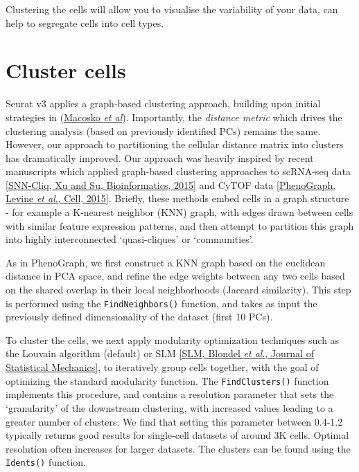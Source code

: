 \documentclass[
]{book}
\begin{document}
Clustering the cells will allow you to visualise the variability of your data, can help to segregate cells into cell types.

\subsubsection*{}\label{section-10}

\section{Cluster cells}\label{cluster-cells}

Seurat v3 applies a graph-based clustering approach, building upon initial strategies in (\href{http://www.cell.com/abstract/S0092-8674(15)00549-8}{Macosko \emph{et al}}). Importantly, the \emph{distance metric} which drives the clustering analysis (based on previously identified PCs) remains the same. However, our approach to partitioning the cellular distance matrix into clusters has dramatically improved. Our approach was heavily inspired by recent manuscripts which applied graph-based clustering approaches to scRNA-seq data \href{http://bioinformatics.oxfordjournals.org/content/early/2015/02/10/bioinformatics.btv088.abstract}{{[}SNN-Cliq, Xu and Su, Bioinformatics, 2015{]}} and CyTOF data \href{http://www.ncbi.nlm.nih.gov/pubmed/26095251}{{[}PhenoGraph, Levine \emph{et al}., Cell, 2015{]}}. Briefly, these methods embed cells in a graph structure - for example a K-nearest neighbor (KNN) graph, with edges drawn between cells with similar feature expression patterns, and then attempt to partition this graph into highly interconnected `quasi-cliques' or `communities'.

As in PhenoGraph, we first construct a KNN graph based on the euclidean distance in PCA space, and refine the edge weights between any two cells based on the shared overlap in their local neighborhoods (Jaccard similarity). This step is performed using the \texttt{FindNeighbors()} function, and takes as input the previously defined dimensionality of the dataset (first 10 PCs).

To cluster the cells, we next apply modularity optimization techniques such as the Louvain algorithm (default) or SLM \href{http://dx.doi.org/10.1088/1742-5468/2008/10/P10008}{{[}SLM, Blondel \emph{et al}., Journal of Statistical Mechanics{]}}, to iteratively group cells together, with the goal of optimizing the standard modularity function. The \texttt{FindClusters()} function implements this procedure, and contains a resolution parameter that sets the `granularity' of the downstream clustering, with increased values leading to a greater number of clusters. We find that setting this parameter between 0.4-1.2 typically returns good results for single-cell datasets of around 3K cells. Optimal resolution often increases for larger datasets. The clusters can be found using the \texttt{Idents()} function.
\end{document}
